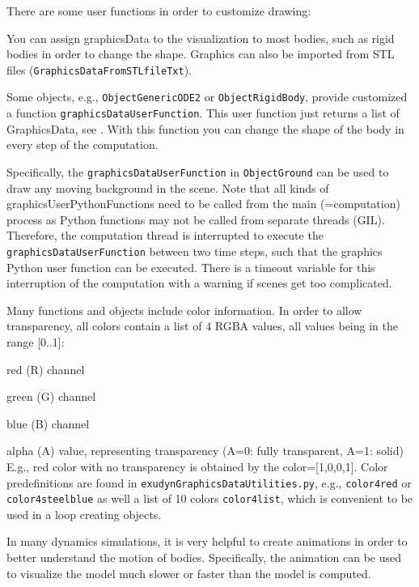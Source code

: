 There are some user functions in order to customize drawing:
\bi
	\item You can assign graphicsData to the visualization to most bodies, such as rigid bodies in order to change the shape. Graphics can also be imported from STL files (\texttt{GraphicsDataFromSTLfileTxt}).
	\item Some objects, e.g., \texttt{ObjectGenericODE2} or \texttt{ObjectRigidBody}, provide customized a function \texttt{graphicsDataUserFunction}. This user function just returns a list of GraphicsData, see . With this function you can change the shape of the body in every step of the computation.
	\item Specifically, the \texttt{graphicsDataUserFunction} in \texttt{ObjectGround} can be used to draw any moving background in the scene.
\ei
Note that all kinds of graphicsUserPythonFunctions need to be called from the main (=computation) process as Python functions may not be called from separate threads (GIL). Therefore, the computation thread is interrupted to execute the \texttt{graphicsDataUserFunction} between two time steps, such that the graphics Python user function can be executed. There is a timeout variable for this interruption of the computation with a warning if scenes get too complicated.

Many functions and objects include color information. In order to allow transparency, all colors contain a list of 4 RGBA values, all values being in the range [0..1]:
\bi
  \item red (R) channel 
	\item green (G) channel  
	\item blue (B) channel 
	\item alpha (A) value, representing transparency (A=0: fully transparent, A=1: solid)
\ei
E.g., red color with no transparency is obtained by the color=[1,0,0,1]. Color predefinitions are found in \texttt{exudynGraphicsDataUtilities.py}, e.g., \texttt{color4red} or \texttt{color4steelblue} as well a list of 10 colors \texttt{color4list}, which is convenient to be used in a loop creating objects.

\label{secGeneratingAnimations}
%
In many dynamics simulations, it is very helpful to create animations in order to better understand the motion of bodies. Specifically, the animation can be used to visualize the model much slower or faster than the model is computed.

